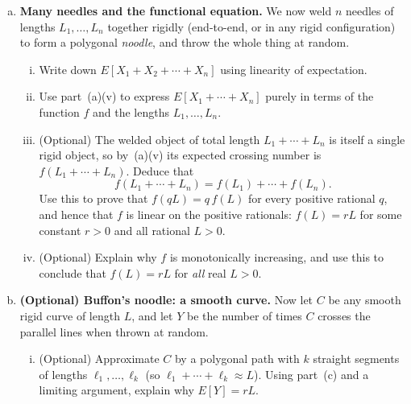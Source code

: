 \documentclass[12pt]{article}
\begin{document}
\begin{enumerate}[(a)]
\begin{enumerate}[(i)]
    \item Using linearity of expectation, write $E[X_1 + X_2]$ in terms
      of $E[X_1]$ and $E[X_2]$.

    \item Use part~(a)(v) to write $E[X_1 + X_2]$ as a function of
      $L_1$ and $L_2$.
  \end{enumerate}

  \item \textbf{Many needles and the functional equation.}
  We now weld $n$ needles of lengths $L_1, \ldots, L_n$ together rigidly
  (end-to-end, or in any rigid configuration) to form a polygonal
  \emph{noodle}, and throw the whole thing at random.

  \begin{enumerate}[(i)]
    \item Write down $E[X_1 + X_2 + \cdots + X_n]$ using linearity of
      expectation.

    \item Use part~(a)(v) to express $E[X_1 + \cdots + X_n]$ purely in
      terms of the function $f$ and the lengths $L_1, \ldots, L_n$.

    \item (Optional) The welded object of total length $L_1 + \cdots + L_n$ is
      itself a single rigid object, so by~(a)(v) its expected crossing
      number is $f(L_1 + \cdots + L_n)$. Deduce that
      \[
        f(L_1 + \cdots + L_n) = f(L_1) + \cdots + f(L_n).
      \]
      Use this to prove that $f(qL) = q\,f(L)$ for every positive
      rational $q$, and hence that $f$ is linear on the positive
      rationals: $f(L) = rL$ for some constant $r > 0$ and all rational
      $L > 0$.

    \item (Optional) Explain why $f$ is monotonically increasing, and use this to
      conclude that $f(L) = rL$ for \emph{all} real $L > 0$.
  \end{enumerate}

  \item \textbf{(Optional) Buffon's noodle: a smooth curve.}
  Now let $C$ be any smooth rigid curve of length $L$, and let $Y$ be the
  number of times $C$ crosses the parallel lines when thrown at random.

  \begin{enumerate}[(i)]
    \item (Optional) Approximate $C$ by a polygonal path with $k$ straight segments
      of lengths $\ell_1, \ldots, \ell_k$ (so $\ell_1 + \cdots + \ell_k
      \approx L$). Using part~(c) and a limiting argument, explain why
      $E[Y] = rL$.


\end{enumerate}
\end{enumerate}
\end{document}
